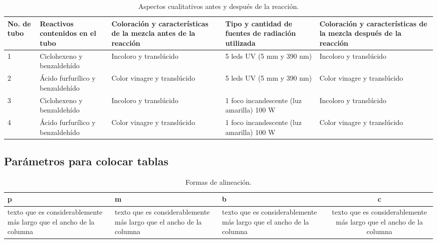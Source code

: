 \documentclass[12pt,letterpaper, onecolumn]{article}
\begin{document}
\begin{table}[H]
\begin{center}

\begin{tabular}{|p{1cm}|m{3cm}|m{3cm}|p{3cm}|p{3cm}|}
\hline 
	\textbf{No. de tubo} & \textbf{{Reactivos}
	contenidos
	en el tubo} & \textbf{Coloración y
	características de
	la mezcla antes de
	la reacción} & \textbf{Tipo y cantidad de
	fuentes de
	radiación utilizada} & \textbf{Coloración y
	características de
	la mezcla después
	de la reacción} \\ 
	\hline 
	1 & Ciclohexeno
	y
	benzaldehído & Incoloro y
	translúcido & 5 leds UV (5 mm y
	390 nm) & Incoloro y
	translúcido \\ 
	\hline 
	2 & Ácido
	furfurílico y
	benzaldehído & Color vinagre y
	translúcido & 5 leds UV (5 mm y
	390 nm) & Color vinagre y
	translúcido \\ 
	\hline 
	3 & Ciclohexeno
	y
	benzaldehído & Incoloro y
	translúcido & 1 foco
	incandescente (luz
	amarilla) 100 W & Incoloro y
	translúcido \\ 
	\hline 
	4 & Ácido
	furfurílico y
	benzaldehído & Color vinagre y
	translúcido & 1 foco
	incandescente (luz
	amarilla) 100 W & Color vinagre y
	translúcido \\ 
	\hline 
	\end{tabular} 
\caption{Aspectos cualitativos antes y después de la reacción.}
\label{Tab_Colocando_una_tabla}
\end{center}
\end{table}

\subsection{Parámetros para colocar tablas}



\begin{table}[H]
\begin{center}
	\begin{tabular}{|p{3cm}|m{3cm}|b{3cm}|c|}
	\hline 
	p & m & b & c \\ 
	\hline 
	texto que es considerablemente más largo que el ancho de la columna & 
	texto que es considerablemente más largo que el ancho de la columna & 
	texto que es considerablemente más largo que el ancho de la columna & 
	texto que es considerablemente más largo que el ancho de la columna \\ 
	\hline 
	\end{tabular} 
\caption{Formas de alineación.}
\label{Tab_Parámetros_1}
\end{center}
\end{table}
\end{document}
